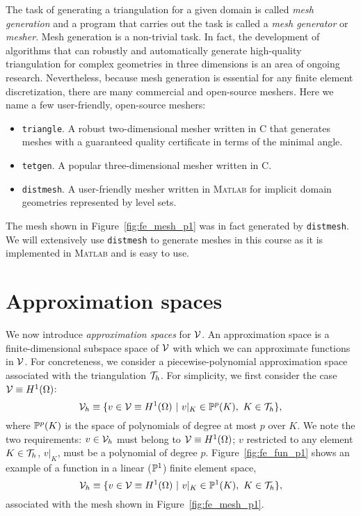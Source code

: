 The task of generating a triangulation for a given domain is called \emph{mesh generation} and a program that carries out the task is called a \emph{mesh generator} or \emph{mesher}.  Mesh generation is a non-trivial task.  In fact, the development of algorithms that can robustly and automatically generate high-quality triangulation for complex geometries in three dimensions is an area of ongoing research.  Nevertheless, because mesh generation is essential for any finite element discretization, there are many commercial and open-source meshers.  Here we name a few user-friendly, open-source meshers:
\begin{itemize}
\item \texttt{triangle}. A robust two-dimensional mesher written in C that generates meshes with a guaranteed quality certificate in terms of the minimal angle.
\item \texttt{tetgen}. A popular three-dimensional mesher written in C.
\item \texttt{distmesh}.  A user-friendly mesher written in \textsc{Matlab} for implicit domain geometries represented by level sets. 
\end{itemize}
The mesh shown in Figure~\ref{fig:fe_mesh_p1} was in fact generated by \texttt{distmesh}.  We will extensively use \texttt{distmesh} to generate meshes in this course as it is implemented in \textsc{Matlab} and is easy to use.


\section{Approximation spaces}
We now introduce \emph{approximation spaces} for $\mathcal{V}$.  An approximation space is a finite-dimensional subspace space of $\mathcal{V}$ with which we can approximate functions in $\mathcal{V}$.  For concreteness, we consider a piecewise-polynomial approximation space associated with the triangulation $\mathcal{T}_h$. For simplicity, we first consider the case $\mathcal{V} \equiv H^1(\Omega)$:
\begin{equation*}
  \mathcal{V}_h \equiv \{ v \in \mathcal{V} \equiv H^1(\Omega) \ | \ v|_K \in \mathbb{P}^p(K), \ K \in \mathcal{T}_h \},
  \label{eq:fe_Vh}
\end{equation*}
where $\mathbb{P}^p(K)$ is the space of polynomials of degree at most $p$ over $K$.
We note the two requirements: $v \in \mathcal{V}_h$ must belong to $\mathcal{V} \equiv H^1(\Omega)$; 
$v$ restricted to any element $K \in \mathcal{T}_h$, $v|_K$, must be a polynomial of degree $p$. Figure~\ref{fig:fe_fun_p1} shows an example of a function in a linear ($\mathbb{P}^1$) finite element space,
\begin{equation}
  \mathcal{V}_h \equiv \{ v \in \mathcal{V} \equiv H^1(\Omega) \ | \ v|_K \in \mathbb{P}^1(K), \ K \in \mathcal{T}_h \},
  \label{eq:fe_lin_Vh}
\end{equation}
associated with the mesh shown in Figure~\ref{fig:fe_mesh_p1}.

